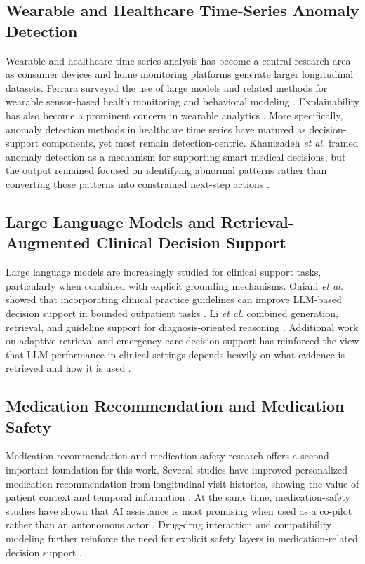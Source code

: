 \documentclass[conference]{IEEEtran}
\begin{document}
\subsection{Wearable and Healthcare Time-Series Anomaly Detection}

Wearable and healthcare time-series analysis has become a central research area as consumer devices and home monitoring platforms generate larger longitudinal datasets. Ferrara surveyed the use of large models and related methods for wearable sensor-based health monitoring and behavioral modeling \cite{ferrara2024wearable}. Explainability has also become a prominent concern in wearable analytics \cite{abdelaal2024xai}. More specifically, anomaly detection methods in healthcare time series have matured as decision-support components, yet most remain detection-centric. Khanizadeh \textit{et al.} framed anomaly detection as a mechanism for supporting smart medical decisions, but the output remained focused on identifying abnormal patterns rather than converting those patterns into constrained next-step actions \cite{khanizadeh2025anomaly}.

\subsection{Large Language Models and Retrieval-Augmented Clinical Decision Support}

Large language models are increasingly studied for clinical support tasks, particularly when combined with explicit grounding mechanisms. Oniani \textit{et al.} showed that incorporating clinical practice guidelines can improve LLM-based decision support in bounded outpatient tasks \cite{oniani2024guidelines}. Li \textit{et al.} combined generation, retrieval, and guideline support for diagnosis-oriented reasoning \cite{li2025garg}. Additional work on adaptive retrieval and emergency-care decision support has reinforced the view that LLM performance in clinical settings depends heavily on what evidence is retrieved and how it is used \cite{prabha2025adaptive,noll2025emergency}.

\subsection{Medication Recommendation and Medication Safety}

Medication recommendation and medication-safety research offers a second important foundation for this work. Several studies have improved personalized medication recommendation from longitudinal visit histories, showing the value of patient context and temporal information \cite{mi2024acdnet,chairat2024medrec}. At the same time, medication-safety studies have shown that AI assistance is most promising when used as a co-pilot rather than an autonomous actor \cite{bucker2024pharm,ong2025medsafety}. Drug-drug interaction and compatibility modeling further reinforce the need for explicit safety layers in medication-related decision support \cite{luo2024ddi}.
\end{document}
